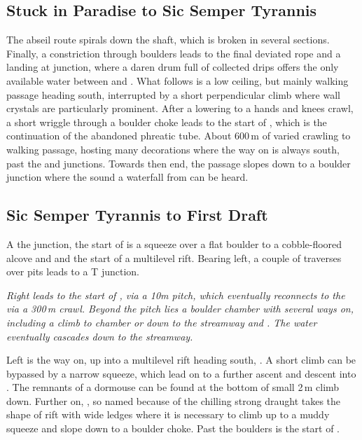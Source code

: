 \subsection{Stuck in Paradise to Sic Semper Tyrannis}
The abseil route spirals down the shaft, which is broken in several sections. Finally, a constriction through boulders leads to the final deviated rope and a landing at  junction, where a daren drum full of collected drips offers the only available water between  and . What follows is a low ceiling, but mainly walking passage heading south, interrupted by a short perpendicular climb where wall crystals are particularly prominent. After a lowering to a hands and knees crawl, a short wriggle through a boulder choke leads to the start of , which is the continuation of the abandoned phreatic tube. About 600\,m of varied crawling to walking passage, hosting many decorations  where the way on is always south, past the  and  junctions. Towards then end, the passage slopes down to a boulder junction where the sound a waterfall from  can be heard. 

\subsection{Sic Semper Tyrannis to First Draft}
A the junction, the start of  is a squeeze over a flat boulder to a cobble-floored alcove and and the start of a multilevel rift. Bearing left, a couple of traverses over pits leads to a T junction. 

\textit{Right leads to the start of , via a 10m pitch, which eventually reconnects to the  via a 300\,m crawl. Beyond the pitch lies a boulder chamber with several ways on, including a climb to  chamber or down to the streamway and . The water eventually cascades down to the  streamway.}

Left is the way on, up into a multilevel rift heading south, . A short climb can be bypassed by a narrow squeeze, which lead on to a further ascent and descent into . The remnants of a dormouse can be found at the bottom of small 2\,m climb down. Further on, , so named because of the chilling strong draught takes the shape of rift with wide ledges where it is necessary to climb up to a muddy squeeze and slope down to a boulder choke. Past the boulders is the start of .

